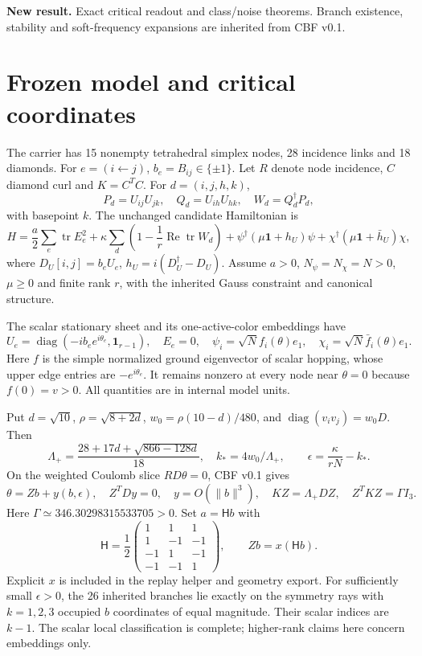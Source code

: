 \documentclass[11pt,a4paper]{article}
\newcommand{\tr}{\operatorname{tr}}\newcommand{\Arg}{\operatorname{Arg}}\newcommand{\diag}{\operatorname{diag}}\newcommand{\Rea}{\operatorname{Re}}\newcommand{\id}{\mathbf1}
\begin{document}
\textbf{New result.} Exact critical readout and class/noise theorems. Branch existence, stability and soft-frequency expansions are inherited from CBF v0.1.
\newpage
\section{Frozen model and critical coordinates}
The carrier has 15 nonempty tetrahedral simplex nodes, 28 incidence links and 18 diamonds. For $e=(i\leftarrow j)$, $b_e=B_{ij}\in\{\pm1\}$. Let $R$ denote node incidence, $C$ diamond curl and $K=C^TC$. For $d=(i,j,h,k)$,
\[
P_d=U_{ij}U_{jk},\quad Q_d=U_{ih}U_{hk},\quad W_d=Q_d^\dagger P_d,
\]
with basepoint $k$. The unchanged candidate Hamiltonian is
\[
H=\frac a2\sum_e\tr E_e^2+\kappa\sum_d\left(1-\frac1r\Rea\tr W_d\right)
+\psi^\dagger(\mu\id+h_U)\psi+\chi^\dagger(\mu\id+\bar h_U)\chi,
\]
where $D_U[i,j]=b_eU_e$, $h_U=i(D_U^\dagger-D_U)$. Assume $a>0$, $N_\psi=N_\chi=N>0$, $\mu\ge0$ and finite rank $r$, with the inherited Gauss constraint and canonical structure.

The scalar stationary sheet and its one-active-color embeddings have
\[
U_e=\diag(-ib_e e^{i\theta_e},\id_{r-1}),\quad E_e=0,\quad
\psi_i=\sqrt N f_i(\theta)e_1,\quad\chi_i=\sqrt N\bar f_i(\theta)e_1.
\]
Here $f$ is the simple normalized ground eigenvector of scalar hopping, whose upper edge entries are $-e^{i\theta_e}$. It remains nonzero at every node near $\theta=0$ because $f(0)=v>0$. All quantities are in internal model units.

Put $d=\sqrt{10}$, $\rho=\sqrt{8+2d}$, $w_0=\rho(10-d)/480$, and $\diag(v_iv_j)=w_0D$. Then
\[
\Lambda_+=\frac{28+17d+\sqrt{866-128d}}{18},\quad k_*=4w_0/\Lambda_+,
\qquad \epsilon=\frac\kappa{rN}-k_*.
\]
On the weighted Coulomb slice $RD\theta=0$, CBF v0.1 gives
\[
\theta=Zb+y(b,\epsilon),\quad Z^TDy=0,\quad y=O(\|b\|^3),
\quad KZ=\Lambda_+DZ,\quad Z^TKZ=\Gamma I_3.
\]
Here $\Gamma\simeq346.30298315533705>0$. Set $a=\mathsf H b$ with
\[
\mathsf H=\frac12\begin{pmatrix}1&1&1\\1&-1&-1\\-1&1&-1\\-1&-1&1\end{pmatrix},\qquad Zb=x(\mathsf H b).
\]
Explicit $x$ is included in the replay helper and geometry export. For sufficiently small $\epsilon>0$, the 26 inherited branches lie exactly on the symmetry rays with $k=1,2,3$ occupied $b$ coordinates of equal magnitude. Their scalar indices are $k-1$. The scalar local classification is complete; higher-rank claims here concern embeddings only.
\newpage
\end{document}
